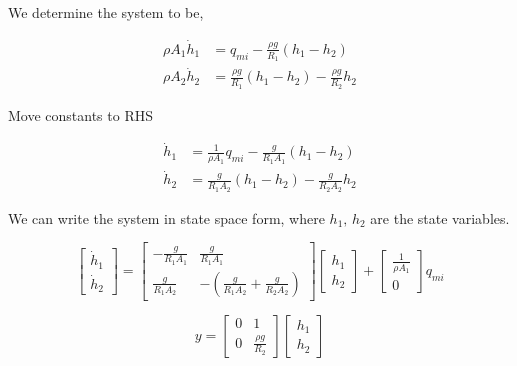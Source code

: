 \documentclass[12pt]{article}
\numberwithin{equation}{subsection}
\newcommand\ddfrac[2]{\frac{\displaystyle #1}{\displaystyle #2}}
\begin{document}
  We determine the system to be,

  \begin{equation}
    \begin{aligned}
      \rho A_1 \dot h_1 &= q_{mi} - \frac{\rho g}{R_1} (h_1 - h_2) \\
      \rho A_2 \dot h_2 &= \frac{\rho g}{R_1} (h_1 - h_2) - \frac{\rho g}{R_2}h_2
    \end{aligned}
  \end{equation}

  Move constants to RHS

  \begin{equation}
    \begin{aligned}
      \dot h_1 &= \frac{1}{\rho A_1}q_{mi} - \frac{g}{R_1 A_1}(h_1 - h_2) \\
      \dot h_2 &= \frac{g}{R_1 A_2} (h_1 - h_2) - \frac{g}{R_2 A_2}h_2
    \end{aligned}
  \end{equation}

  We can write the system in state space form, where $ h_1, \, h_2 $ are the state variables.

  \begin{equation}
    \begin{bmatrix}
      \dot h_1 \\ \dot h_2
    \end{bmatrix} =
    \begin{bmatrix}
      -\ddfrac{g}{R_1A_1} & \ddfrac{g}{R_1A_1} \\
      \ddfrac{g}{R_1A_2} & - \left( \ddfrac{g}{R_1A_2} + \ddfrac{g}{R_2A_2} \right)
    \end{bmatrix}
    \begin{bmatrix}
      h_1 \\ h_2
    \end{bmatrix} +
    \begin{bmatrix}
      \ddfrac{1}{\rho A_1} \\ 0
    \end{bmatrix} q_{mi}
  \end{equation}

  \begin{equation}
    y =
    \begin{bmatrix}
      0 & 1 \\
      0 & \ddfrac{\rho g}{R_2}
    \end{bmatrix}
    \begin{bmatrix}
      h_1 \\ h_2
    \end{bmatrix}
  \end{equation}
\end{document}

